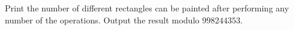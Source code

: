 Print the number of different rectangles can be painted after performing any number of the operations.
Output the result modulo $998244353$. 